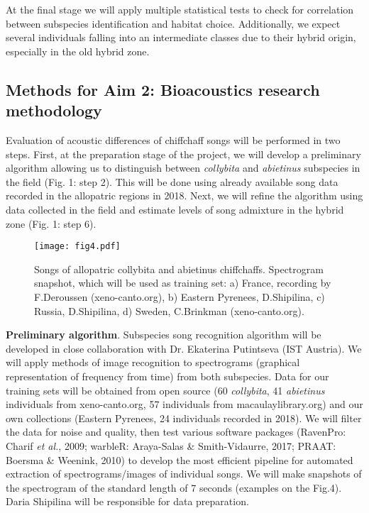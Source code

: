 \documentclass[11pt,a4paper]{article}
\begin{document}
At the final stage we will apply multiple statistical tests to check for correlation between subspecies identification and habitat choice. Additionally, we expect several individuals falling into an intermediate classes due to their hybrid origin, especially in the old hybrid zone.




\subsection{Methods for Aim 2: Bioacoustics research methodology}
Evaluation of acoustic differences of chiffchaff songs will be performed in two steps. First, at the preparation stage of the project, we will develop a preliminary algorithm allowing us to distinguish between \textit{collybita} and \textit{abietinus} subspecies in the field (Fig. 1: step 2). This will be done using already available song data recorded in the allopatric regions in 2018. Next, we will refine the algorithm using data collected in the field and estimate levels of song admixture in the hybrid zone (Fig. 1: step 6). 

\begin{figure}
\begin{center}
\texttt{[image: fig4.pdf]}\\
\caption{ \label{Fig:4}\small
Songs of allopatric collybita and abietinus chiffchaffs. Spectrogram snapshot, which will be used as training set: a) France, recording by F.Deroussen (xeno-canto.org), b) Eastern Pyrenees, D.Shipilina, c) Russia, D.Shipilina, d) Sweden, C.Brinkman (xeno-canto.org).
}
\end{center}
\end{figure}

\textbf{Preliminary algorithm}. Subspecies song recognition algorithm will be developed in close collaboration with Dr. Ekaterina Putintseva (IST Austria). We will apply methods of image recognition to spectrograms (graphical representation of frequency from time) from both subspecies. Data for our training sets will be obtained from open source (60 \textit{collybita}, 41 \textit{abietinus} individuals from xeno-canto.org, 57 individuals from macaulaylibrary.org) and our own collections (Eastern Pyrenees, 24 individuals recorded in 2018). We will filter the data for noise and quality, then test various software packages (RavenPro: Charif \textit{et al.}, 2009; warbleR: Araya-Salas \& Smith-Vidaurre, 2017; PRAAT: Boersma \& Weenink, 2010) to develop the most efficient pipeline for automated extraction of spectrograms/images of individual songs. We will make snapshots of the spectrogram of the standard length of 7 seconds (examples on the Fig.4). Daria Shipilina will be responsible for data preparation.
\end{document}
